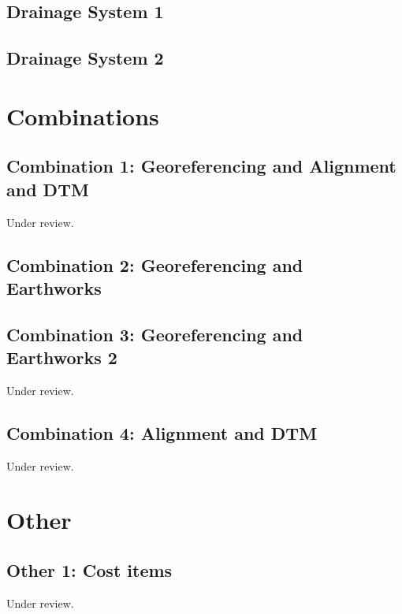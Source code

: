 \documentclass{scrartcl}
\begin{document}
\subsection{Drainage System 1}
\label{sec:drainage_1}
\clearpage

\subsection{Drainage System 2}
\label{sec:drainage_2}
\clearpage

\section{Combinations}

\subsection{Combination 1: Georeferencing and Alignment and DTM} %
\label{sec:align_dtm_1}
Under review.%
\clearpage

\subsection{Combination 2: Georeferencing and Earthworks}
\label{sec:georef_earth_1}
\clearpage

\subsection{Combination 3: Georeferencing and Earthworks 2} %
\label{sec:georef_earth_2}
Under review.%
\clearpage

\subsection{Combination 4: Alignment and DTM}
\label{sec:align_dtm_2}
Under review.%
\clearpage

\section{Other}

\subsection{Other 1: Cost items} %
\label{sec:other_1}
Under review.%
\clearpage
\end{document}
